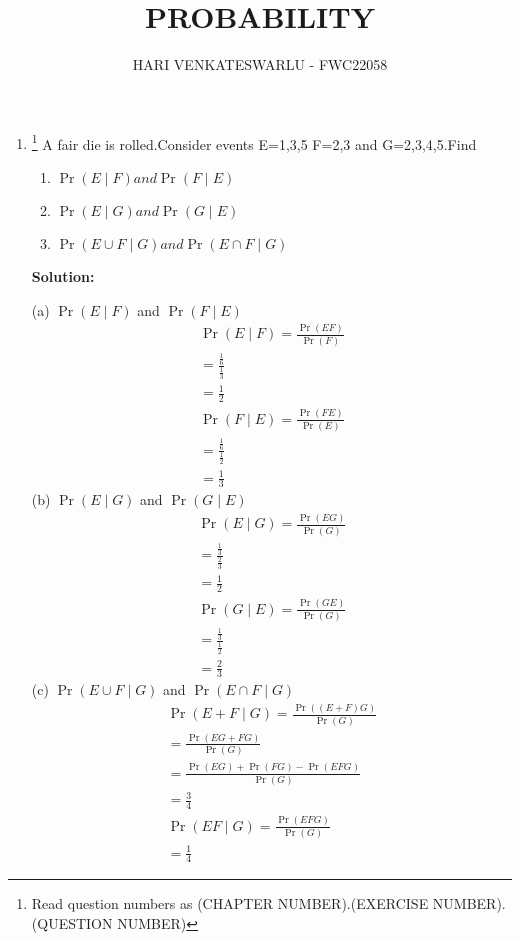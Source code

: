 \documentclass{article}
\providecommand{\pr}[1]{\ensuremath{\Pr\left(#1\right)}}
\newcommand{\solution}{\noindent \textbf{Solution: }}
\providecommand{\pr}[1]{\ensuremath{\Pr\left(#1\right)}}
\begin{document}
\title{PROBABILITY}
\author{\Large HARI VENKATESWARLU - FWC22058}
\date{}

\maketitle

\begin{enumerate}[label=13.\arabic{enumi}.\arabic{enumii}]%
\setcounter{enumi}{0}
\setcounter{enumii}{11}

\item \footnote{Read question numbers as (CHAPTER NUMBER).(EXERCISE NUMBER).(QUESTION NUMBER)} {A fair die is rolled.Consider events E=1,3,5 F=2,3 and G=2,3,4,5.Find}
\begin{enumerate}
\item $\pr{E \mid F} and \pr{F \mid E}$
\item $\pr{E \mid G} and \pr{G \mid E}$
\item $\pr{{E \cup F} \mid G} and \pr{{E \cap F} \mid G}$
\end{enumerate}
	\solution\\
	\begin{table}[h]\centering
	
	\caption{}\label{table1:}
\end{table}

(a) $\pr{E \mid F}$ and $\pr{F \mid E}$
\begin{align}
&\pr{E \mid F} = \frac{\pr{EF}}{\pr{F}}&\\
&=\frac{\frac{1}{6}}{\frac{1}{3}}&\\
&=\frac{1}{2}&\\
&\pr{F \mid E} = \frac{\pr{FE}}{\pr{E}}&\\
&= \frac{\frac{1}{6}}{\frac{1}{2}}&\\
&=\frac{1}{3}&
\end{align}
(b) $\pr{E \mid G}$ and $\pr{G \mid E}$
\begin{align}
&\pr{E \mid G} = \frac{\pr{EG}}{\pr{G}}&\\
&=\frac{\frac{1}{3}}{\frac{2}{3}}&\\
&=\frac{1}{2}&\\
&\pr{G \mid E} = \frac{\pr{GE}}{\pr{G}}&\\
&=\frac{\frac{1}{3}}{\frac{1}{2}}&\\
&=\frac{2}{3}&
\end{align}
(c) $\pr{{E \cup F} \mid G}$ and $\pr{{E \cap F} \mid G}$
\begin{align}
&\pr{{E+F} \mid G} = \frac{\pr{{(E+F)}G}}{\pr{G}}&\\
&=\frac{\pr{{EG+F}G}}{\pr{G}}&\\
&=\frac{\pr{EG}+\pr{FG}-\pr{EFG}}{\pr{G}}&\\
&=\frac{3}{4}&\\
&\pr{{EF} \mid G} = \frac{\pr{EFG}}{\pr{G}}&\\
&=\frac{1}{4}&
\end{align}
\end{enumerate}
\end{document}
